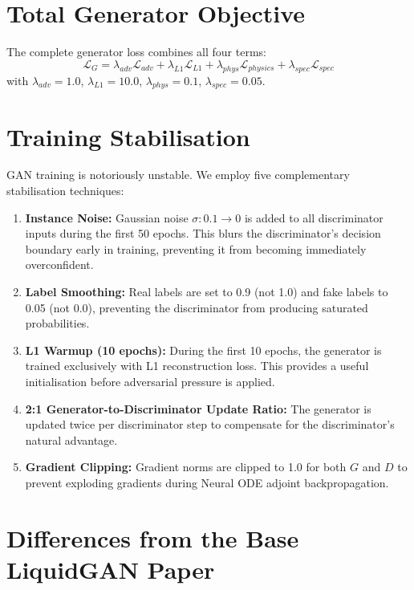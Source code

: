 \section{Total Generator Objective}

The complete generator loss combines all four terms:
\begin{equation}
    \mathcal{L}_G = \lambda_{adv} \mathcal{L}_{adv} + \lambda_{L1} \mathcal{L}_{L1} + \lambda_{phys} \mathcal{L}_{physics} + \lambda_{spec} \mathcal{L}_{spec}
    \label{eq:total}
\end{equation}
with $\lambda_{adv} = 1.0$, $\lambda_{L1} = 10.0$, $\lambda_{phys} = 0.1$, $\lambda_{spec} = 0.05$.

\section{Training Stabilisation}

GAN training is notoriously unstable. We employ five complementary stabilisation techniques:

\begin{enumerate}
    \item \textbf{Instance Noise:} Gaussian noise $\sigma: 0.1 \to 0$ is added to all discriminator inputs during the first 50 epochs. This blurs the discriminator's decision boundary early in training, preventing it from becoming immediately overconfident.
    \item \textbf{Label Smoothing:} Real labels are set to 0.9 (not 1.0) and fake labels to 0.05 (not 0.0), preventing the discriminator from producing saturated probabilities.
    \item \textbf{L1 Warmup (10 epochs):} During the first 10 epochs, the generator is trained exclusively with L1 reconstruction loss. This provides a useful initialisation before adversarial pressure is applied.
    \item \textbf{2:1 Generator-to-Discriminator Update Ratio:} The generator is updated twice per discriminator step to compensate for the discriminator's natural advantage.
    \item \textbf{Gradient Clipping:} Gradient norms are clipped to 1.0 for both $G$ and $D$ to prevent exploding gradients during Neural ODE adjoint backpropagation.
\end{enumerate}

\section{Differences from the Base LiquidGAN Paper}

